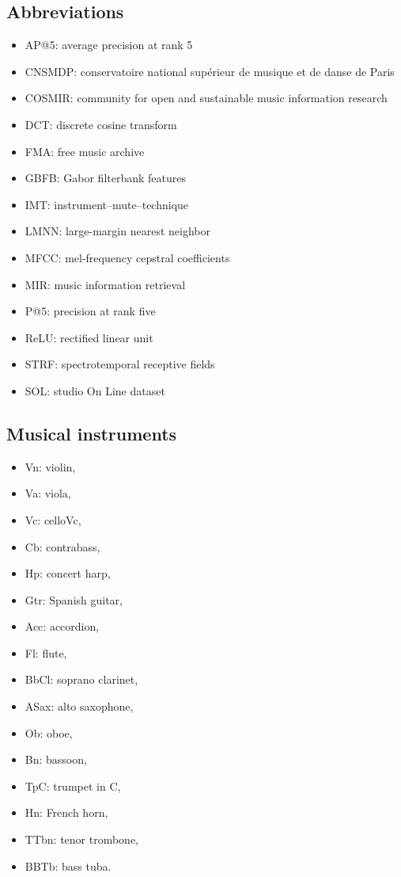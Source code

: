 \documentclass{bmcart}
\begin{document}
\begin{backmatter}

\section*{Abbreviations}

\begin{itemize}
  \item AP@5: average precision at rank 5
  \item CNSMDP: conservatoire national sup\'erieur de musique et de danse de Paris
  \item COSMIR: community for open and sustainable music information research
  \item DCT: discrete cosine transform
  \item FMA: free music archive
  \item GBFB: Gabor filterbank features
  \item IMT: instrument--mute--technique
  \item LMNN: large-margin nearest neighbor
  \item MFCC: mel-frequency cepstral coefficients
  \item MIR: music information retrieval
  \item P@5: precision at rank five
  \item ReLU: rectified linear unit
  \item STRF: spectrotemporal receptive fields
  \item SOL: studio On Line dataset
\end{itemize}

\subsection*{Musical instruments}

\begin{itemize}
  \item Vn: violin,
  \item Va: viola,
  \item Vc: celloVc,
  \item Cb: contrabass,
  \item Hp: concert harp,
  \item Gtr: Spanish guitar,
  \item Acc: accordion,
  \item Fl: flute,
  \item BbCl: soprano clarinet,
  \item ASax: alto saxophone,
  \item Ob: oboe,
  \item Bn: bassoon,
  \item TpC: trumpet in C,
  \item Hn: French horn,
  \item TTbn: tenor trombone,
  \item BBTb: bass tuba.
\end{itemize}


\end{backmatter}
\end{document}
